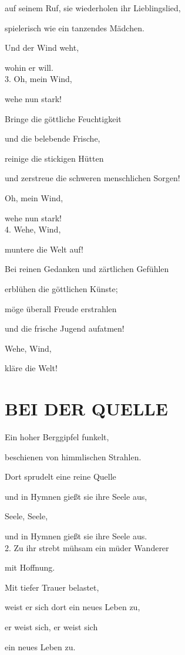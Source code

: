 \documentclass[11pt,a5paper,twoside]{article}
\begin{document}
auf seinem Ruf, sie wiederholen ihr Lieblingslied,

spielerisch wie ein tanzendes Mädchen.

Und der Wind weht, 
 
wohin er will.\\

3. Oh, mein Wind, 

wehe nun stark! 

Bringe die göttliche Feuchtigkeit

und die belebende Frische, 

reinige die stickigen Hütten

und zerstreue die schweren menschlichen Sorgen!

Oh, mein Wind,

wehe nun stark!\\


4. Wehe, Wind, 

muntere die Welt auf! 

Bei reinen Gedanken und zärtlichen Gefühlen 

erblühen die göttlichen Künste;

möge überall Freude erstrahlen

und die frische Jugend aufatmen! 

Wehe, Wind, 

kläre die Welt!


\section[Bei der Quelle]{BEI DER QUELLE}

Ein hoher Berggipfel funkelt,

beschienen von himmlischen Strahlen. 

Dort sprudelt eine reine Quelle 

und in Hymnen gießt sie ihre Seele aus,

Seele, Seele,

und in Hymnen gießt sie ihre Seele aus.\\

2. Zu ihr strebt mühsam ein müder Wanderer

 mit Hoffnung. 

Mit tiefer Trauer belastet,

weist er sich dort ein neues Leben zu,

er weist sich, er weist sich

ein neues Leben zu.\\
\end{document}
